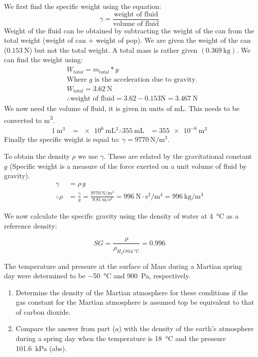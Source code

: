 \begin{solution}
  We first find the specific weight using the equation:
  \begin{equation*}
    \gamma = \frac{\textrm{weight of fluid}}{\textrm{volume of fluid}}
  \end{equation*}
  Weight of the fluid can be obtained by subtracting the weight of the
  can from the total weight (weight of can $+$ weight of pop). We are
  given the weight of the can ($\SI{0.153}{\N}$) but not the total
  weight. A total mass is rather given $(\SI{0.369}{\kg})$. We can
  find the weight using:
  \begin{align*}
    &W_{total} = m_{total} * g \\
    &\textrm{Where $g$ is the acceleration due to gravity.} \\
    &W_{total} =  \SI{3.62}{\N} \\
    &\therefore \textrm{weight of fluid} = \num{3.62} - \num{0.153}\si{\N} =
    \SI{3.467}{\N}
\end{align*}
We now need the volume of fluid, it is given in units of
\si{\mL}. This needs to be converted to \si{\m^3}.
\begin{align*}
 \SI{1}{\m^3} &= \SI{e6}{\mL^3}
\therefore \SI{355}{\mL} &= \SI{355e-6}{\m^3}
\end{align*}
Finally the specific weight is equal to: $\gamma = \SI{9770}{\N/\m^3}$.

To obtain the density $\rho$ we use $\gamma$. These are related by the
gravitational constant $g$ (Specific weight is a measure of the force
exerted on a unit volume of fluid by gravity).
\begin{align*}
  \gamma &= \rho\,g \\
  \therefore \rho &= \frac{\gamma}{g} =
                    \frac{\SI{9770}{\N\per\m^3}}{\SI{9.81}{\m\per\s^2}}
                    = \SI{996}{\N\cdot{}\s^2\per\m^4} = \SI{996}{\kg/\m^3}
\end{align*}

We now calculate the specific gravity using the density of water at
\SI{4}{\celsius} as a reference density:

\begin{equation*}
  SG = \frac{\rho}{\rho_{H_2O@\SI{4}{\celsius}}} = \num{0.996}
\end{equation*}
\end{solution}

\begin{question}
  The temperature and pressure at the surface of Mars during a Martian
  spring day were determined to be \SI{-50}{\celsius} and \SI{900}{\Pa},
  respectively.
  \begin{enumerate}[label=\alph*)]
  \item Determine the density of the Martian atmosphere for these
    conditions if the gas constant for the Martian atmosphere is
    assumed top be equivalent to that of carbon dioxide.
  \item Compare the answer from part ($a$) with the density of the
    earth's atmosphere during a spring day when the temperature is
    \SI{18}{\celsius} and the pressure \SI{101.6}{\kPa} (abs).
  \end{enumerate}
\end{question}

